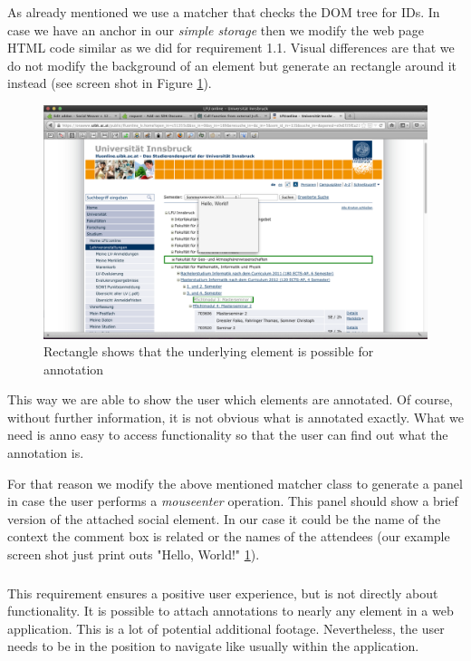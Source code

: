 As already mentioned we use a matcher that checks the DOM tree for IDs. In case we have an anchor in our \emph{simple storage} then we modify the web page HTML code similar as we did for requirement 1.1. Visual differences are that we do not modify the background of an element but generate an rectangle around it instead (see screen shot in Figure \ref{annotation-rectangle-sample2}). 

\begin{figure} \centering
		\includegraphics[width=12cm]{images/annotation-rectangle-sample2.png}
		\caption{Rectangle shows that the underlying element is possible for annotation}
		\label{annotation-rectangle-sample2}
\end{figure} 

This way we are able to show the user which elements are annotated. Of course, without further information, it is not obvious what is annotated exactly. What we need is anno easy to access functionality so that the user can find out what the annotation is. 

For that reason we modify the above mentioned matcher class to generate a panel in case the user performs a \emph{mouseenter} operation. This panel should show a brief version of the attached social element. In our case it could be the name of the context the comment box is related or the names of the attendees (our example screen shot just print outs "Hello, World!" \ref{annotation-rectangle-sample2}). 

\subsubsection[User View Management]{\reqPii}\label{user-disturbance}

This requirement ensures a positive user experience, but is not directly about functionality. It is possible to attach annotations to nearly any element in a web application. This is a lot of potential additional footage. Nevertheless, the user needs to be in the position to navigate like usually within the application. 

